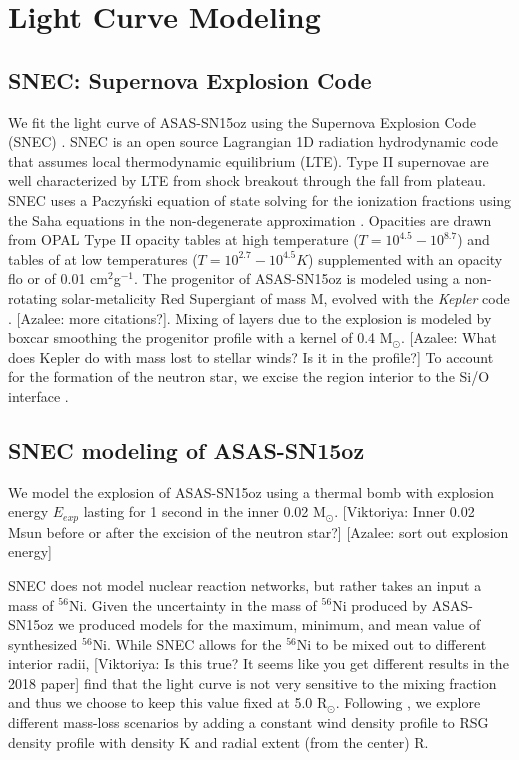 \documentclass[preprint]{aastex61}
\newcommand{\azaleecomment}[1]{{\color{red} [{#1}]}}
\newcommand{\Azalee}[1]{\azaleecomment{Azalee: #1}}
\newcommand{\viktoriyacomment}[1]{{\color{blue} [{#1}]}}
\newcommand{\Viktoriya}[1]{\viktoriyacomment{Viktoriya: #1}}
\newcommand{\msunperiod}{M$_{\odot}$}
\begin{document}
 
\section{Light Curve Modeling}
\subsection{SNEC: Supernova Explosion Code}
We fit the light curve of ASAS-SN15oz using the Supernova Explosion Code (SNEC) \citep{2015morozova}.
SNEC is an open source Lagrangian 1D radiation hydrodynamic code that assumes local thermodynamic equilibrium (LTE).
Type II supernovae are well characterized by LTE from shock breakout through the fall from plateau. 
SNEC uses a Paczy\'nski equation of state \citep{1983paczynski} solving for the ionization fractions using the Saha equations in the non-degenerate approximation \citep{2000zaghloul}. 
Opacities are drawn from OPAL Type II opacity tables \citep{1996iglesias} at high temperature ($T=10^{4.5}-10^{8.7}$) and tables of \citet{2005ferguson} at low temperatures ($T = 10^{2.7}-10^{4.5}K$) supplemented with an opacity flo
or of 0.01 cm$^2$g$^{-1}$. 
The progenitor of ASAS-SN15oz is modeled using a non-rotating solar-metalicity Red Supergiant of mass M, evolved with the {\it Kepler} code \citep{2016sukhbold}. 
\Azalee{more citations?}. 
Mixing of layers due to the explosion is modeled by boxcar smoothing the progenitor profile with a kernel of 0.4 \msunperiod.
\Azalee{What does Kepler do with mass lost to stellar winds? Is it in the profile?}
To account for the formation of the neutron star, we excise the region interior to the Si/O interface \citep{2018morozova}. 
\subsection{SNEC modeling of ASAS-SN15oz}\label{sec:LCmodeling}
We model the explosion of ASAS-SN15oz using a thermal bomb with explosion energy $E_{exp}$ lasting for 1 second in the inner 0.02 \msunperiod. 
\Viktoriya{Inner 0.02 Msun before or after the excision of the neutron star?}
\Azalee{sort out explosion energy}

SNEC does not model nuclear reaction networks, but rather takes an input a mass of ${}^{56}$Ni. 
Given the uncertainty in the mass of ${}^{56}$Ni produced by ASAS-SN15oz we produced models for the maximum, minimum, and mean value of synthesized ${}^{56}$Ni.
While SNEC allows for the ${}^{56}$Ni to be mixed out to different interior radii, \Viktoriya{Is this true? It seems like you get different results in the 2018 paper} find that the light curve is not very sensitive to the mixing fraction and thus we choose to keep this value fixed at 5.0 R$_{\odot}$. 
Following \citet{2017morozova}, we explore different mass-loss scenarios by adding a constant wind density profile to RSG density profile with density K and radial extent (from the center) R.
\end{document}
